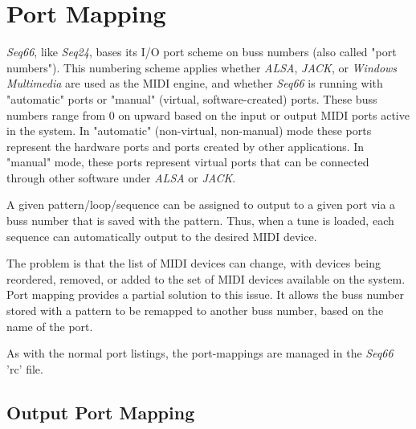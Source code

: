 %
%
%

\section{Port Mapping}
\label{sec:port_mapping}

   \textsl{Seq66}, like \textsl{Seq24}, bases its I/O port scheme on buss
   numbers (also called "port numbers").  This numbering scheme applies whether
   \textsl{ALSA}, \textsl{JACK}, or \textsl{Windows Multimedia}
   are used as the MIDI engine, and whether \textsl{Seq66} is running with
   "automatic" ports or "manual" (virtual, software-created) ports.
   These buss numbers range from 0 on upward
   based on the input or output MIDI ports active in the system.
   In "automatic" (non-virtual, non-manual) mode
   these ports represent the hardware ports and ports created by
   other applications.  In "manual" mode, these ports represent virtual ports
   that can be connected through other software under \textsl{ALSA} or
   \textsl{JACK}.

   A given pattern/loop/sequence can be assigned to output to a given port via
   a buss number that is saved with the pattern.  Thus, when a tune is loaded,
   each sequence can automatically output to the desired MIDI device.

   The problem is that the list of MIDI devices can change, with devices being
   reordered, removed, or added to the set of MIDI devices available on the
   system.  Port mapping provides a partial solution to this issue.  It allows
   the buss number stored with a pattern to be remapped to another buss number,
   based on the name of the port.

   As with the normal port listings, the port-mappings are managed in the
   \textsl{Seq66} 'rc' file.

\subsection{Output Port Mapping}
\label{subsec:output_port_mapping}

